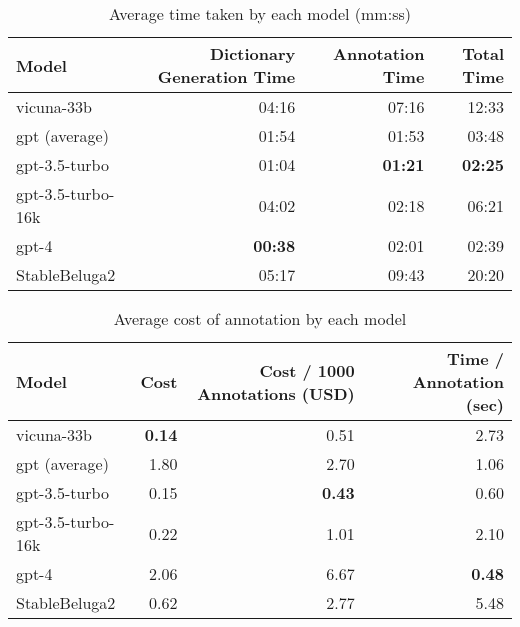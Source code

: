 \begin{table}[htpb]
  \centering
  \begin{tabular}{lrrr}
    \hline
    Model & Dictionary Generation Time & Annotation Time & Total Time \\
    \hline
    vicuna-33b & 04:16 & 07:16 & 12:33 \\
    gpt (average) & 01:54 & 01:53 & 03:48 \\
    gpt-3.5-turbo & 01:04 & \textbf{01:21} & \textbf{02:25} \\
    gpt-3.5-turbo-16k & 04:02 & 02:18 & 06:21 \\
    gpt-4 & \textbf{00:38} & 02:01 & 02:39 \\
    StableBeluga2 & 05:17 & 09:43 & 20:20 \\
    \hline
  \end{tabular}
  \caption[Average time taken]{Average time taken by each model (mm:ss)}
  \label{tab:open-time}
\end{table}

\begin{table}[htpb]
  \centering
  \begin{tabular}{lrrr}
    \hline
    Model & Cost & Cost / 1000 Annotations (USD) & Time / Annotation (sec) \\
    \hline
    vicuna-33b & \textbf{0.14} & 0.51 & 2.73 \\
    gpt (average) & 1.80 & 2.70 & 1.06 \\
    gpt-3.5-turbo & 0.15 & \textbf{0.43} & 0.60 \\
    gpt-3.5-turbo-16k & 0.22 & 1.01 & 2.10 \\
    gpt-4 & 2.06 & 6.67 & \textbf{0.48} \\
    StableBeluga2 & 0.62 & 2.77 & 5.48 \\
    \hline
  \end{tabular}
  \caption[Cost Analysis]{Average cost of annotation by each model}
  \label{tab:open-cost}
\end{table}
